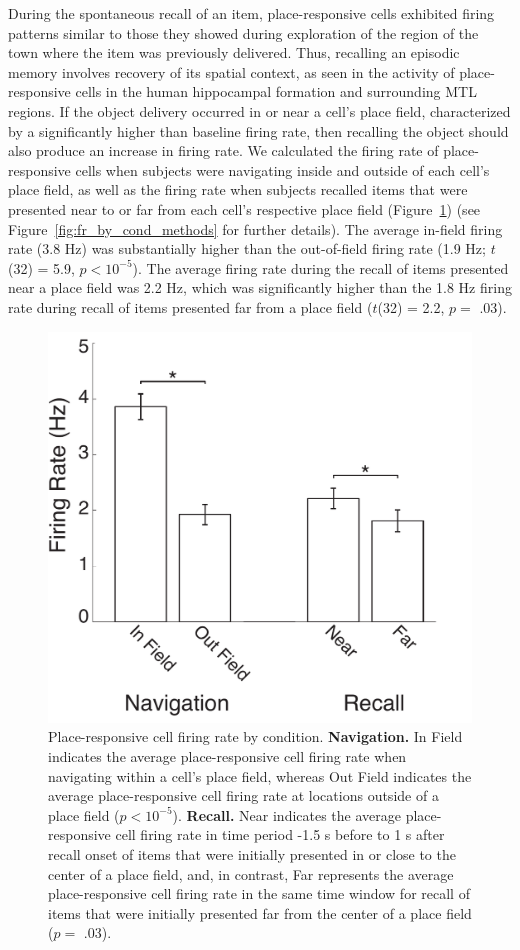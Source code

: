 During the spontaneous recall of an item, place-responsive cells exhibited firing patterns similar to those they showed during exploration of the region of the town where the item was previously delivered.  Thus, recalling an episodic memory involves recovery of its spatial context, as seen in the activity of place-responsive cells in the human hippocampal formation and surrounding MTL regions. If the object delivery occurred in or near a cell's place field, characterized by a significantly higher than baseline firing rate, then recalling the object should also produce an increase in firing rate. We calculated the firing rate of place-responsive cells when subjects were navigating inside and outside of each cell's place field, as well as the firing rate when subjects recalled items that were presented near to or far from each cell's respective place field (Figure~\ref{fig:fr_by_cond}) (see Figure~\ref{fig:fr_by_cond_methods} for further details).  The average in-field firing rate (3.8 Hz) was substantially higher than the out-of-field firing rate  (1.9 Hz; $t$(32) = 5.9, $p < 10^{-5}$).  The average firing rate during the recall of items presented near a place field was 2.2 Hz, which was significantly higher than the 1.8 Hz firing rate during recall of items presented far from a place field ($t$(32) = 2.2, $p =$ .03).

\begin{figure}[t]
\centering
  \includegraphics[width=.6\textwidth]{./tex/dboy/figs/fig4}
  \caption[Place-responsive cell firing rate by condition]{Place-responsive cell firing rate by condition. \textbf{Navigation.} In Field indicates the average place-responsive cell firing rate when navigating within a cell's place field, whereas Out Field indicates the average place-responsive cell firing rate at locations outside of a place field ($p < 10^{-5}$). \textbf{Recall.} Near indicates the average place-responsive cell firing rate in time period -1.5 s before to 1 s after recall onset of items that were initially presented in or close to the center of a place field, and, in contrast, Far represents the average place-responsive cell firing rate in the same time window for recall of items that were initially presented far from the center of a place field ($p =$ .03).}
\label{fig:fr_by_cond}
\end{figure}

